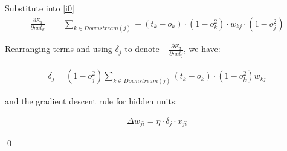 \documentclass[preview]{standalone}
\begin{document}
Substitute into \cref{i0}
\begin{align}
\label{i4}
\frac{\partial E_d}{\partial net_{{k}}}
&= \sum_{{k\in Downstream(j)}}-(t_{{k}}-o_{{k}})\cdot(1-o_{{k}}^2)\cdot
w_{{kj}} \cdot(1-o_j^2)
\end{align}

Rearranging terms and using $\delta_j$ to denote $-\frac{\partial E_d}{\partial
net_j}$, we have:

\begin{align}
    \delta_j = (1-o_j^2)\sum_{{k\in
    Downstream(j)}}(t_{{k}}-o_{{k}})\cdot(1-o_{{k}}^2)w_{{kj}}
\end{align}

and the gradient descent rule for hidden units:

\begin{align}
    \Delta w_{ji} = \eta \cdot \delta_j \cdot x_{ji}
\end{align}

\qed
\end{document}
